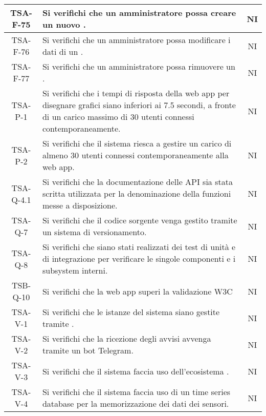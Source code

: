 \begin{center}
\begin{longtable}{|c|p{10cm}|c|}
			 \hline
			 TSA-F-75 & Si verifichi che un amministratore possa creare un nuovo \glock{gateway}. & NI \\
			 \hline
			 TSA-F-76 & Si verifichi che un amministratore possa modificare i dati di un \glock{gateway}. & NI \\
			 \hline
			 TSA-F-77 & Si verifichi che un amministratore possa rimuovere un \glock{gateway}. & NI \\
			 \hline
			 TSA-P-1 & Si verifichi che i tempi di risposta della web app per disegnare grafici siano inferiori ai 7.5 secondi, a fronte di un carico massimo di 30 utenti connessi contemporaneamente. & NI \\
			 \hline
			 TSA-P-2 & Si verifichi che il sistema riesca a gestire un carico di almeno 30 utenti connessi contemporaneamente alla web app. & NI \\
			 \hline
			 TSA-Q-4.1 & Si verifichi che la documentazione delle API sia stata scritta utilizzata per la denominazione della funzioni messe a disposizione. & NI \\
			 \hline
			 TSA-Q-7 & Si verifichi che il codice sorgente venga gestito tramite un sistema di versionamento. & NI \\
			 \hline
			 TSA-Q-8 & Si verifichi che siano stati realizzati dei test di unità e di integrazione per verificare le singole componenti e i subsystem interni. & NI \\
			 \hline
			 TSB-Q-10 & Si verifichi che la web app superi la validazione W3C & NI \\
			 \hline
			 TSA-V-1 & Si verifichi che le istanze del sistema siano gestite tramite \glock{Docker}. & NI \\
			 \hline
			 TSA-V-2 & Si verifichi che la ricezione degli avvisi avvenga tramite un bot Telegram. & NI \\
			 \hline
			 TSA-V-3 & Si verifichi che il sistema faccia uso dell'ecosistema \glock{Kafka}. & NI \\
			 \hline
			 TSA-V-4 & Si verifichi che il sistema faccia uso di un time series database per la memorizzazione dei dati dei sensori. & NI \\

\end{longtable}
\end{center}
